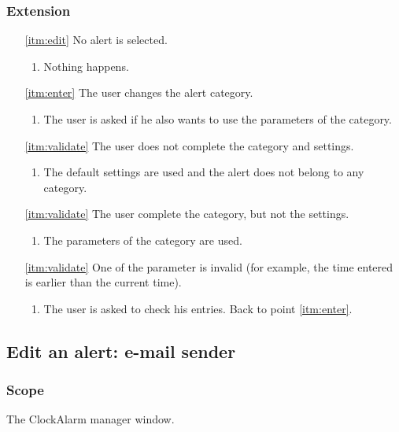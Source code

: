 \subsubsection{Extension}
\begin{enumerate}
	\item[\ref{itm:edit}] No alert is selected.
	\begin{enumerate}[i]
		\item Nothing happens.
	\end{enumerate}
	
	\item[\ref{itm:enter}] The user changes the alert category.
	\begin{enumerate}[i]
		\item The user is asked if he also wants to use the parameters of the category.
	\end{enumerate}
	
	\item[\ref{itm:validate}] The user does not complete the category and settings.
	\begin{enumerate}[i]
		\item The default settings are used and the alert does not belong to any category.
	\end{enumerate}
	
	\item[\ref{itm:validate}] The user complete the category, but not the settings.
	\begin{enumerate}[i]
		\item The parameters of the category are used.
	\end{enumerate}
	
	\item[\ref{itm:validate}] One of the parameter is invalid (for example, the time entered is earlier than the current time).
	\begin{enumerate}[i]
		\item The user is asked to check his entries. Back to point \ref{itm:enter}.
	\end{enumerate}
\end{enumerate}

\subsection{Edit an alert: e-mail sender}

\subsubsection{Scope}
The ClockAlarm manager window.
